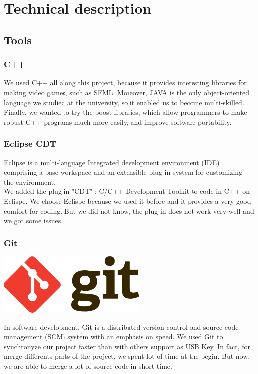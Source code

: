 \documentclass{scrreprt}
\begin{document}
		  \part{Technical description}
		  \chapter{Tools}
		  \section{C++}
		  We used C++ all along this project, because it provides interesting libraries for making video games, such as SFML.
		  Moreover, JAVA is the only object-oriented language we studied at the university, so it enabled us to become multi-skilled.
		  Finally, we wanted to try the boost libraries, which allow programmers to make robust C++ programs much more easily, and improve
		  software portability.
		  \section{Eclipse CDT}
		 Eclipse is a multi-language Integrated development environment (IDE) comprising a base workspace and an extensible plug-in system for customizing the environment.\\
		We added the plug-in "CDT" : C/C++ Development Toolkit to code in C++ on Eclispe. We choose Eclispe because we used it before and it provides a very good comfort for coding. But we did not know, the plug-in does not work very well and we got some issues.
		  \section{Git}
		\begin {center}
		\includegraphics[scale=0.5]{Git.png}
		\end{center}
		In software development, Git is a distributed version control and source code management (SCM) system with an emphasis on speed.
		We used Git to synchronyze our project faster than with others support as USB Key. In fact, for merge differents parts of the project, we spent lot of time at the begin. But now, we are able to merge a lot of source code in short time.\\
\end{document}
